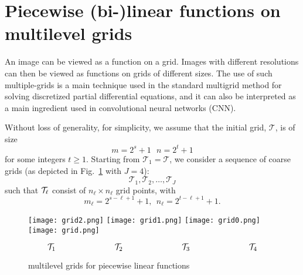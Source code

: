 \section{Piecewise (bi-)linear functions on multilevel grids}\label{sec:functions}
An image can be viewed as a function on a grid.  Images
with different resolutions can then be viewed as functions on grids of
different sizes.  The use of such multiple-grids is a main technique
used in the standard multigrid method for solving discretized partial
differential equations, 
and it can also be interpreted as a main ingredient used in
convolutional neural networks (CNN). 

Without loss of generality, for simplicity, we assume that the initial
grid, $\mathcal T$, is of size
$$
m=2^{s}+1~~~n=2^{t}+1 
$$
for some integers $t\ge 1$.
Starting from $\mathcal T_1=\mathcal T$,  we consider a sequence of
coarse grids (as depicted in Fig.~\ref{mgrid} with $J=4$):
\begin{equation}
\label{grids}
\mathcal T_1, \mathcal T_2, \ldots, \mathcal T_J
\end{equation}
such that ${\cal T}_\ell$ consist of $n_\ell\times n_\ell$ grid
points, with 
\begin{equation}
\label{mn-ell}
 m_\ell=2^{s-\ell+1}+1,~~ n_\ell=2^{t-\ell+1}+1.   
\end{equation}
\begin{figure}[!htbp]\label{mgrid}
	\begin{center}
		\texttt{[image: grid2.png]} \quad 
		\texttt{[image: grid1.png]} \quad 
		\texttt{[image: grid0.png]} \quad 
		\texttt{[image: grid.png]} 
	\end{center}
	$$ 
	\mathcal T_1\hskip1in \mathcal T_2\hskip1in \mathcal T_3\hskip1in\mathcal T_4
	$$
	\caption{multilevel grids for piecewise linear functions}
\end{figure}

